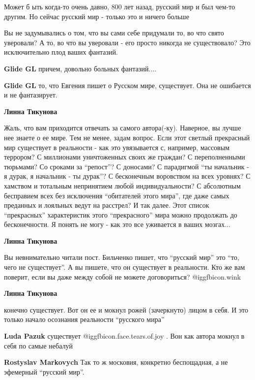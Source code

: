 \begin{itemize}
Может б ыть когда-то очень давно, 800 лет назад, русский мир и был чем-то
другим. Но сейчас русский мир - только это и ничего больше



Вы не задумывались о том, что вы сами себе придумали то, во что свято
уверовали? А то, во что вы уверовали - его просто никогда не существовало? Это
исключительно плод ваших фантазий.

\begin{itemize} %
\textbf{Glide GL} причем, довольно больных фантазий....

\textbf{Glide GL} то, что Евгения пишет о Русском мире, существует. Она не ошибается и не фантазирует.

\textbf{Линна Тикунова} 

Жаль, что вам приходится отвечать за самого автора(-ку). Наверное, вы лучше нее
знаете о ее мире. Тем не менее, задам вопрос. Если этот светлый прекрасный мир
существует в реальности - как это увязывается с, например, массовым террором? С
миллионами уничтоженных своих же граждан? С переполненными тюрьмами? Со сроками
за \enquote{репост}? С доносами? С парадигмой \enquote{ты начальник - я дурак, я начальник - ты
дурак}? С бесконечным воровством на всех уровнях? С хамством и тотальным
непринятием любой индивидуальности? С абсолютным бесправием всех без исключения
\enquote{обитателей этого мира}, где даже самых преданных и лояльных ведут на расстрел?
И так далее. Этот список \enquote{прекрасных} характеристик этого \enquote{прекрасного} мира
можно продолжать до бесконечности. Я понять не могу - как это все уживается в
ваших мозгах...


\textbf{Линна Тикунова} 

Вы невнимательно читали пост. Бильченко пишет, что \enquote{русский мир} это \enquote{то, чего
не существует}. А вы пишете, что он существует в реальности. Кто же вам
поверит, если вы даже между собой не можете договориться?  @igg{fbicon.wink} 

\textbf{Линна Тикунова} 

конечно существует. Вот он ее и мокнул рожей (зачеркнуто) лицом в себя. И это
только начало осознания реальности \enquote{русского мира}

\textbf{Luda Pazuk} существует  @igg{fbicon.face.tears.of.joy} . Вон как автора мокнул в себя по самые небалуй

\textbf{Rostyslav Markovych} Так то ж московия, конкретно беспощадная, а не эфемерный \enquote{русский мир}.


\end{itemize}
\end{itemize}
